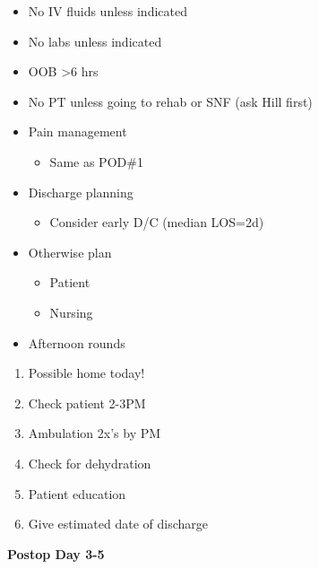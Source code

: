 \documentclass[
]{book}
\providecommand{\tightlist}{%
  \setlength{\itemsep}{0pt}\setlength{\parskip}{0pt}}
\begin{document}
\begin{itemize}
\tightlist
\item
  No IV fluids unless indicated
\item
  No labs unless indicated
\item
  OOB \textgreater6 hrs
\item
  No PT unless going to rehab or SNF (ask Hill first)
\item
  Pain management

  \begin{itemize}
  \tightlist
  \item
    Same as POD\#1
  \end{itemize}
\item
  Discharge planning

  \begin{itemize}
  \tightlist
  \item
    Consider early D/C (median LOS=2d)
  \end{itemize}
\item
  Otherwise plan

  \begin{itemize}
  \tightlist
  \item
    Patient
  \item
    Nursing
  \end{itemize}
\item
  Afternoon rounds
\end{itemize}

\begin{enumerate}
\def\labelenumi{\arabic{enumi})}
\tightlist
\item
  Possible home today!
\item
  Check patient 2-3PM
\item
  Ambulation 2x's by PM
\item
  Check for dehydration
\item
  Patient education
\item
  Give estimated date of discharge
\end{enumerate}

\textbf{Postop Day 3-5}
\end{document}
